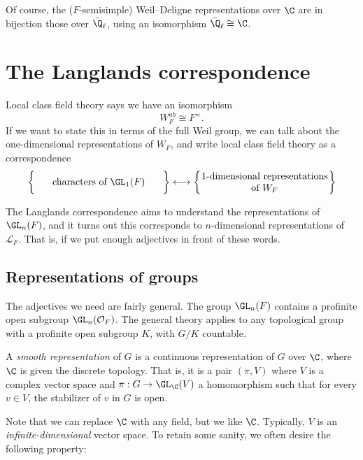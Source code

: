 \documentclass[a4paper]{article}
\begin{document}
Of course, the ($F$-semisimple) Weil--Deligne representations over $\C$ are in bijection those over $\bar{\Q}_\ell$, using an isomorphism $\bar{\Q}_\ell \cong \C$.

\section{The Langlands correspondence}
Local class field theory says we have an isomorphism
\[
  W_F^{ab} \cong F^\times.
\]
If we want to state this in terms of the full Weil group, we can talk about the one-dimensional representations of $W_F$, and write local class field theory as a correspondence
\[
   \left\{\parbox{4.6cm}{\centering characters of $\GL_1(F)$}\vphantom{\parbox{4.6cm}{\centering $1$-dimensional representations\\ of $W_F$}}\right\} \longleftrightarrow \left\{\parbox{4.6cm}{\centering $1$-dimensional representations\\ of $W_F$}\right\}
\]

The Langlands correspondence aims to understand the representations of $\GL_n(F)$, and it turns out this corresponds to $n$-dimensional representations of $\mathcal{L}_F$. That is, if we put enough adjectives in front of these words.

%

\subsection{Representations of groups}
The adjectives we need are fairly general. The group $\GL_n(F)$ contains a profinite open subgroup $\GL_n(\mathcal{O}_F)$. The general theory applies to any topological group with a profinite open subgroup $K$, with $G/K$ countable.

\begin{defi}
  A \emph{smooth representation} of $G$ is a continuous representation of $G$ over $\C$, where $\C$ is given the discrete topology. That is, it is a pair $(\pi, V)$ where $V$ is a complex vector space and $\pi: G \to \GL_\C(V)$ a homomorphism such that for every $v \in V$, the stabilizer of $v$ in $G$ is open.
\end{defi}
Note that we can replace $\C$ with any field, but we like $\C$. Typically, $V$ is an \emph{infinite-dimensional} vector space. To retain some sanity, we often desire the following property:
\end{document}
